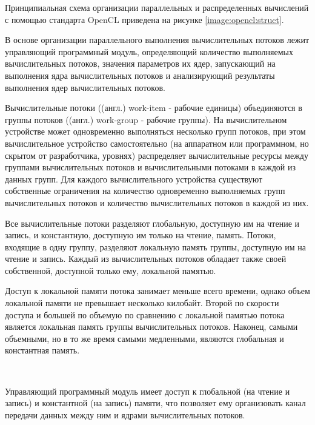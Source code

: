 Принципиальная схема организации параллельных и распределенных вычислений с помощью стандарта OpenCL приведена на рисунке \ref{image:opencl:struct}.

В основе организации параллельного выполнения вычислительных потоков лежит управляющий программный модуль, определяющий количество выполняемых вычислительных потоков, значения параметров их ядер, запускающий на выполнения ядра вычислительных потоков и анализирующий результаты выполнения ядер вычислительных потоков.

Вычислительные потоки ((англ.) work-item - рабочие единицы) объединяются в группы потоков ((англ.) work-group - рабочие группы). На вычислительном устройстве может одновременно выполняться несколько групп потоков, при этом вычислительное устройство самостоятельно (на аппаратном или программном, но скрытом от разработчика, уровнях) распределяет вычислительные ресурсы между группами вычислительных потоков и вычислительными потоками в каждой из данных групп. Для каждого вычислительного устройства существуют собственные ограничения на количество одновременно выполняемых групп вычислительных потоков и количество вычислительных потоков в каждой из них.

Все вычислительные потоки разделяют глобальную, доступную им на чтение и запись, и константную, доступную им только на чтение, память. Потоки, входящие в одну группу, разделяют локальную память группы, доступную им на чтение и запись. Каждый из вычислительных потоков обладает также своей собственной, доступной только ему, локальной памятью.

Доступ к локальной памяти потока занимает меньше всего времени, однако объем локальной памяти не превышает несколько килобайт. Второй по скорости доступа и большей по объемую по сравнению с локальной памятью потока является локальная память группы вычислительных потоков. Наконец, самыми объемными, но в то же время самыми медленными, являются глобальная и константная память.

\begin{landscape}
~
\vfill
{}
\vfill
~
\end{landscape}

Управляющий программный модуль имеет доступ к глобальной (на чтение и запись) и константной (на запись) памяти, что позволяет ему организовать канал передачи данных между ним и ядрами вычислительных потоков.


